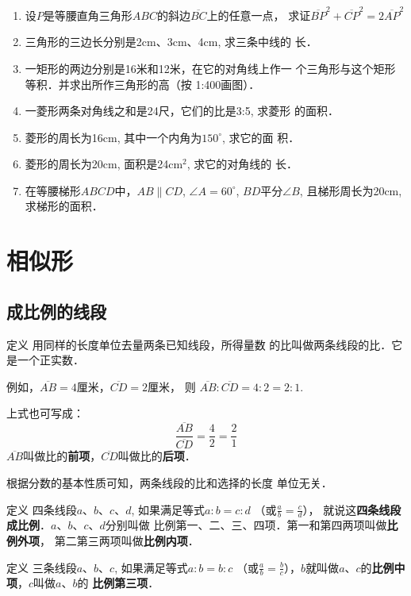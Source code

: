 \begin{enumerate}
\item 设$P$是等腰直角三角形$ABC$的斜边$\overline{BC}$上的任意一点，
求证$\overline{BP}^2+\overline{CP}^2=2\overline{AP}^2$
\item 三角形的三边长分别是2cm、3cm、4cm, 求三条中线的
长．
\item 一矩形的两边分别是16米和12米，在它的对角线上作一
个三角形与这个矩形等积．并求出所作三角形的高（按
1:400画图）．
\item 一菱形两条对角线之和是24尺，它们的比是3:5, 求菱形
的面积．
\item 菱形的周长为16cm, 其中一个内角为$150^{\circ}$, 求它的面
积．
\item 菱形的周长为20cm, 面积是24cm$^2$, 求它的对角线的
长．
\item 在等腰梯形$ABCD$中，$AB\parallel CD$, $\angle A=60^{\circ}$, $BD$平分$\angle B$, 且梯形周长为20cm, 求梯形的面积．
\end{enumerate}

\section{相似形}
\subsection{成比例的线段}

\begin{blk}
  {定义} 用同样的长度单位去量两条已知线段，所得量数
的比叫做两条线段的比．它是一个正实数．  
\end{blk}

例如，$\overline{AB}=4$厘米，$\overline{CD}=2$厘米，
则 $\overline{AB}:\overline{CD}=4:2=2:1$.

上式也可写成：
\[\frac{\overline{AB}}{\overline{CD}}=\frac{4}{2}=\frac{2}{1}\]
$\overline{AB}$叫做比的\textbf{前项}，$\overline{CD}$叫做比的\textbf{后项}．

根据分数的基本性质可知，两条线段的比和选择的长度
单位无关．


\begin{blk}
    {定义}
四条线段$a$、$b$、$c$、$d$, 如果满足等式$a:b=c:d$
（或$\frac{a}{b}=\frac{c}{d}$），
就说这\textbf{四条线段成比例}．$a$、$b$、$c$、$d$分别叫做
比例第一、二、三、四项．第一和第四两项叫做\textbf{比例外项}，
第二第三两项叫做\textbf{比例内项}．
\end{blk}

\begin{blk}
    {定义}
三条线段$a$、$b$、$c$, 如果满足等式$a:b=b:c$
（或$\frac{a}{b}=\frac{b}{c}$），$b$就叫做$a$、$c$的\textbf{比例中项}，$c$叫做$a$、$b$的
\textbf{比例第三项}．
\end{blk}


